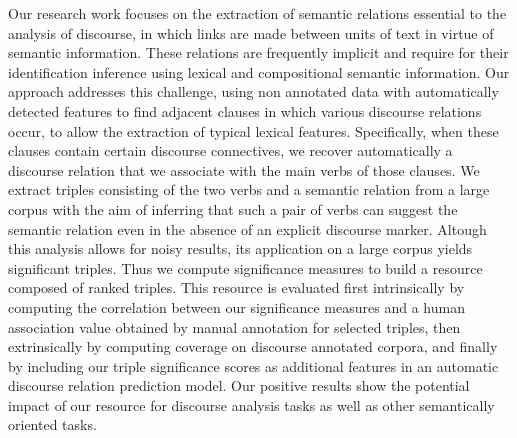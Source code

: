 \documentclass[10pt, a4paper, twopage, headinclude, footinclude, BCOR5mm]{book}
\begin{document}
\begin{table}[t!]
\end{table} 
\noindent
Our research work focuses on the extraction of semantic relations essential to the analysis of discourse, in which links are made between units of text in virtue of semantic information.  These relations are frequently implicit and require for their identification inference using lexical and compositional semantic information. Our approach addresses this challenge, using non annotated data with automatically detected features to find adjacent clauses in which various discourse relations occur, to allow the extraction of typical lexical features.  Specifically, when these clauses contain certain discourse connectives, we recover automatically a discourse relation that we associate with the main verbs of those clauses. We extract triples consisting of the two verbs and a semantic relation from a large corpus with the aim of inferring that such a pair of verbs can suggest the semantic relation even in the absence of an explicit discourse marker. Altough this analysis allows for noisy results, its application on a large corpus yields significant triples.   Thus we compute significance measures to build a resource composed of ranked triples.  This resource is evaluated first intrinsically by computing the correlation between our significance measures and a human association value obtained by manual annotation for selected triples, then extrinsically by computing coverage on discourse annotated corpora, and finally by including our triple significance scores as additional features in an automatic discourse relation prediction model.  Our positive results show the potential impact of our resource for discourse analysis tasks as well as other semantically oriented tasks.  
\end{document}
